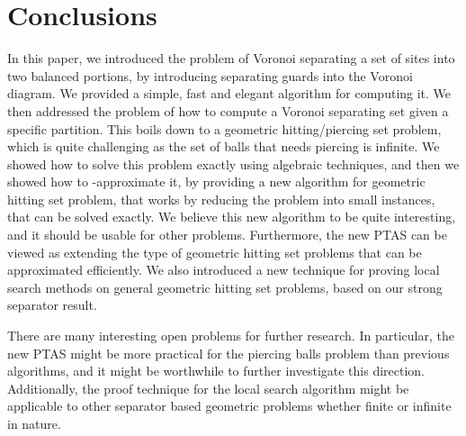 \InSubmitVer{\documentclass[11pt]{article}}
\numberwithin{figure}{section}
\numberwithin{table}{section}
\numberwithin{equation}{section}
\newcommand{\seclab}[1]{\label{section:#1}}
\newcommand{\Term}[1]{\textsf{#1}}
\newcommand{\PTAS}{\Term{PTAS}\xspace}
\begin{document}
\section{Conclusions}
\seclab{conclusions}

In this paper, we introduced the problem of Voronoi separating a set
of sites into two balanced portions, by introducing separating guards
into the Voronoi diagram. We provided a simple, fast and elegant
algorithm for computing it. We then addressed the problem of how to
compute a Voronoi separating set given a specific partition. This
boils down to a geometric hitting/piercing set problem, which is
quite challenging as the set of balls that needs piercing is
infinite. We showed how to solve this problem exactly using algebraic
techniques, and then we showed how to -approximate it, by
providing a new algorithm for geometric hitting set problem, that
works by reducing the problem into small instances, that can be solved
exactly. We believe this new algorithm to be quite interesting, and it
should be usable for other problems.  Furthermore, the new \PTAS can
be viewed as extending the type of geometric hitting set problems that
can be approximated efficiently. We also introduced a new technique for 
proving local search methods on general geometric hitting set problems, 
based on our strong separator result. 




There are many interesting open problems for further research. In 
particular, the new \PTAS might be more practical for 
the piercing balls problem than previous algorithms, and it might be
worthwhile to further investigate this direction. Additionally, the 
proof technique for the local search algorithm might be applicable 
to other separator based geometric problems whether finite or infinite 
in nature.
\end{document}
